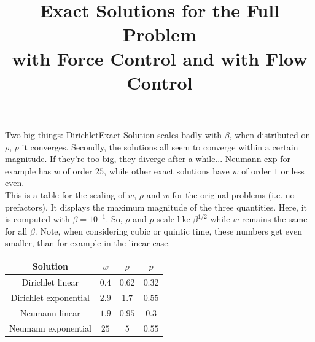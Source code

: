 \documentclass[11pt, a4paper]{article}
\title{Exact Solutions for the Full Problem \\with Force Control and with Flow Control}
\date{}
\theoremstyle{definition}
\begin{document}
Two big things: DirichletExact Solution scales badly with $\beta$, when distributed on $\rho$, $p$ it converges.
Secondly, the solutions all seem to converge within a certain magnitude. If they're too big, they diverge after a while... Neumann exp for example has $w$ of order $25$, while other exact solutions have $w$ of order $1$ or less even.
\\
This is a table for the scaling of $w$, $\rho$ and $w$ for the original problems (i.e. no prefactors). It displays the maximum magnitude of the three quantities. Here, it is computed with $\beta = 10^{-1}$. So, $\rho$ and $p$ scale like $\beta^{1/2}$ while $w$ remains the same for all $\beta$. Note, when considering cubic or quintic time, these numbers get even smaller, than for example in the linear case.
\begin{center}
	\begin{tabular}{ |c| c |c |c |}
		\hline
		Solution & $w$ & $\rho$ & $p$ \\ 
		\hline
		Dirichlet linear & $0.4$ & $0.62$ & $0.32$ \\  
		Dirichlet exponential & $2.9$ & $1.7$ & $0.55$ \\  
		Neumann linear & $1.9$ & $0.95$ & $0.3$ \\  
		Neumann exponential & $25$ & $5$ & $0.55$ \\ 
		\hline
	\end{tabular}
\end{center}
\end{document}
